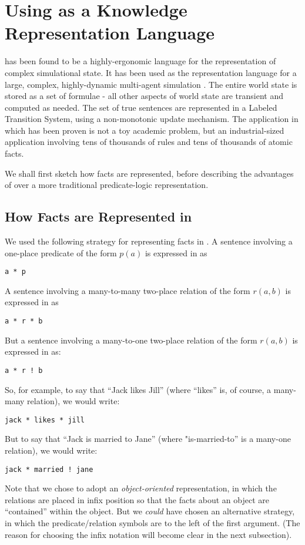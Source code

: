 \section{Using \ELFULL{} as a Knowledge Representation Language}\label{kr}

\ELFULL{} has been found to be a highly-ergonomic language for the
representation of complex simulational state.  It has been used as the
representation language for a large, complex, highly-dynamic
multi-agent simulation \cite{evans-and-short}.  The entire world state
is stored as a set of formulae - all other aspects of world state are
transient and computed as needed.  The set of true sentences are represented in a Labeled Transition System, using a non-monotonic update mechanism.  The application in which \ELABR{} has been
proven is not a toy academic problem, but an industrial-sized
application involving tens of thousands of rules and tens of thousands
of atomic facts.

We shall first sketch how facts are represented, before describing the advantages of \ELKR{} over a more traditional predicate-logic representation.

\subsection{How Facts are Represented in \ELKR{}}

We used the following strategy for representing facts in \ELKR{}.
A sentence involving a one-place predicate of the form $p(a)$ is expressed in \ELKR{} as 
\begin{verbatim}
a * p
\end{verbatim}
A sentence involving a many-to-many two-place relation of the form $r(a,b)$ is expressed in \ELKR{} as
\begin{verbatim}
a * r * b
\end{verbatim}
But a sentence involving a many-to-one two-place relation of the form $r(a,b)$ is expressed in \ELKR{} as:
\begin{verbatim}
a * r ! b
\end{verbatim}
So, for example, to say that ``Jack likes Jill'' (where ``likes'' is, of course, a many-many relation), we would write:
\begin{verbatim}
jack * likes * jill
\end{verbatim}
But to say that ``Jack is married to Jane'' (where "is-married-to'' is a many-one relation), we would write:
\begin{verbatim}
jack * married ! jane
\end{verbatim}
Note that we chose to adopt an \emph{object-oriented} representation, in which the relations are placed in infix position so that the facts about an object are ``contained'' within the object.
But we \emph{could} have chosen an alternative strategy, in which the predicate/relation symbols are to the left of the first argument. (The reason for choosing the infix notation will become clear in the next subsection).

